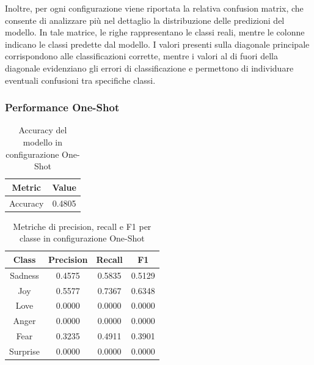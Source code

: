 \documentclass[a4paper,12pt]{article}
\begin{document}
Inoltre, per ogni configurazione viene riportata la relativa confusion matrix, che consente di analizzare più nel dettaglio la distribuzione delle predizioni del modello. In tale matrice, le righe rappresentano le classi reali, mentre le colonne indicano le classi predette dal modello. I valori presenti sulla diagonale principale corrispondono alle classificazioni corrette, mentre i valori al di fuori della diagonale evidenziano gli errori di classificazione e permettono di individuare eventuali confusioni tra specifiche classi.

\subsubsection*{Performance One-Shot}

\begin{table}[H]
    \centering
    \begin{tabular}{cc}
        \toprule
        Metric   & Value  \\
        \midrule
        Accuracy & 0.4805 \\
        \bottomrule
    \end{tabular}
    \caption{Accuracy del modello in configurazione One-Shot}
\end{table}

\vspace{0.5cm}

\begin{table}[H]
    \centering
    \begin{tabular}{cccc}
        \toprule
        Class    & Precision & Recall & F1     \\
        \midrule
        Sadness  & 0.4575    & 0.5835 & 0.5129 \\
        Joy      & 0.5577    & 0.7367 & 0.6348 \\
        Love     & 0.0000    & 0.0000 & 0.0000 \\
        Anger    & 0.0000    & 0.0000 & 0.0000 \\
        Fear     & 0.3235    & 0.4911 & 0.3901 \\
        Surprise & 0.0000    & 0.0000 & 0.0000 \\
        \bottomrule
    \end{tabular}
    \caption{Metriche di precision, recall e F1 per classe in configurazione One-Shot}
\end{table}

\vspace{0.5cm}
\end{document}
